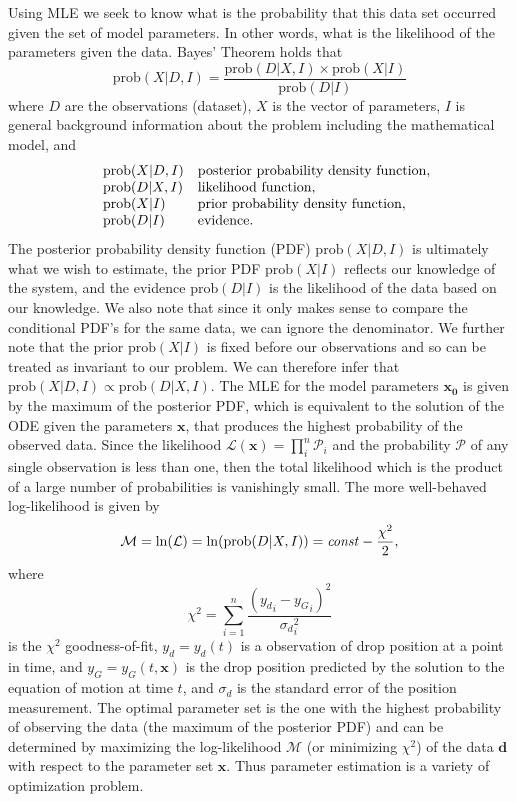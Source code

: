 \documentclass[12pt,a4paper,oneside]{book}
\begin{document}
Using MLE we seek to know what is the probability that this data set occurred given the set of model parameters. In other words, what is the likelihood of the parameters given the data. Bayes' Theorem holds that
\[\mbox{prob}(X|D, I) = \frac{\mbox{prob}(D|X,I) \times \mbox{prob}(X|I)}{\mbox{prob}(D|I)}\]
where $D$ are the observations (dataset), $X$ is the vector of parameters, $I$ is general background information about the problem including the mathematical model, and 
\[\begin{array}{lll}
& \centering \mbox{prob}(X|D, I) & \mbox{posterior probability density function},\\
& \centering \mbox{prob}(D|X, I) & \mbox{likelihood function},\\
& \centering \mbox{prob}(X|I) &  \mbox{prior probability density function},\\
& \centering \mbox{prob}(D|I) &  \mbox{evidence}.
\end{array}
\]
The posterior probability density function (PDF) $\mbox{prob}(X|D, I)$ is ultimately what we wish to estimate, the prior PDF $\mbox{prob}(X|I)$ reflects our knowledge of the system, and the evidence $\mbox{prob}(D|I)$ is the likelihood of the data based on our knowledge. We also note that since it only makes sense to compare the conditional PDF's for the same data, we can ignore the denominator. We further note that the prior $\mbox{prob}(X|I)$ is fixed before our observations and so can be treated as invariant to our problem. We can therefore infer that $\mbox{prob}(X|D, I) \propto \mbox{prob}(D|X, I)$. The MLE for the model parameters $\mathbf{x_0}$ is given by the maximum of the posterior PDF, which is equivalent to the solution of the ODE given the parameters $\mathbf{x}$, that produces the highest probability of the observed data. Since the likelihood $\mathcal{L}(\mathbf{x}) = \prod_i^n \mathcal{P}_i$ and the probability $\mathcal{P}$ of any single observation is less than one, then the total likelihood which is the product of a large number of probabilities is vanishingly small. The more well-behaved log-likelihood is given by
\[\mathcal{M} = \ln(\mathcal{L}) = \ln(\mbox{prob}(D|X, I)) = \mbox{\emph{const}} - \frac{\chi^2}{2},\]
where 
\[
\chi^2 = \sum^n_{i=1} \frac{\left({y_d}_i - {y_G}_i \right)^2}{{\sigma_d}_i^2}
\]
is the $\chi^2$ goodness-of-fit, $y_d = y_d(t)$ is a observation of drop position at a point in time, and $y_G =  y_G(t, \mathbf{x})$ is the drop position predicted by the solution to the equation of motion at time $t$, and $\sigma_d$ is the standard error of the position measurement. The optimal parameter set is the one with the highest probability of observing the data (the maximum of the posterior PDF) and can be determined by maximizing the log-likelihood $\mathcal{M}$ (or minimizing $\chi^2$) of the data $\mathbf{d}$ with respect to the parameter set $\mathbf{x}$. Thus parameter estimation is a variety of optimization problem. 
\end{document}
